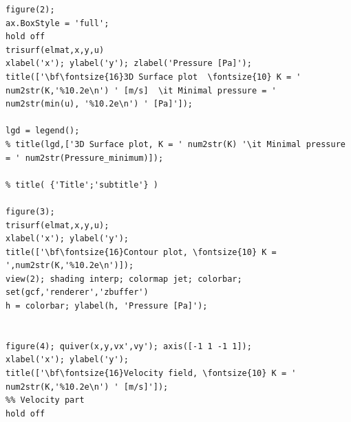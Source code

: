 \documentclass[a4paper]{report}
\begin{document}
\begin{appendices}
\begin{lstlisting}
figure(2);
ax.BoxStyle = 'full';
hold off
trisurf(elmat,x,y,u)
xlabel('x'); ylabel('y'); zlabel('Pressure [Pa]');
title(['\bf\fontsize{16}3D Surface plot  \fontsize{10} K = ' num2str(K,'%10.2e\n') ' [m/s]  \it Minimal pressure = ' num2str(min(u), '%10.2e\n') ' [Pa]']);

lgd = legend();
% title(lgd,['3D Surface plot, K = ' num2str(K) '\it Minimal pressure = ' num2str(Pressure_minimum)]);

% title( {'Title';'subtitle'} )

figure(3); 
trisurf(elmat,x,y,u);
xlabel('x'); ylabel('y');
title(['\bf\fontsize{16}Contour plot, \fontsize{10} K = ',num2str(K,'%10.2e\n')]);
view(2); shading interp; colormap jet; colorbar; set(gcf,'renderer','zbuffer')
h = colorbar; ylabel(h, 'Pressure [Pa]');


figure(4); quiver(x,y,vx',vy'); axis([-1 1 -1 1]);
xlabel('x'); ylabel('y');
title(['\bf\fontsize{16}Velocity field, \fontsize{10} K = ' num2str(K,'%10.2e\n') ' [m/s]']);
%% Velocity part
hold off

\end{lstlisting}

\end{appendices}
\end{document}
